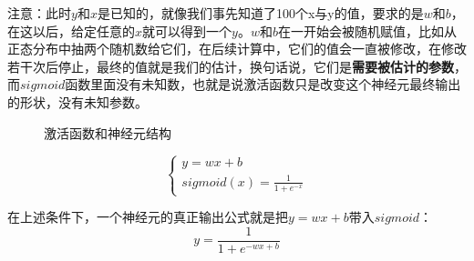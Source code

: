 \documentclass[a5paper, 11pt, openany]{book}
\begin{document}
注意：此时$y$和$x$是已知的，就像我们事先知道了100个x与y的值，要求的是$w$和$b$，在这以后，给定任意的$x$就可以得到一个$y$。$w$和$b$在一开始会被随机赋值，比如从正态分布中抽两个随机数给它们，在后续计算中，它们的值会一直被修改，在修改若干次后停止，最终的值就是我们的估计，换句话说，它们是\textbf{需要被估计的参数}，而$sigmoid$函数里面没有未知数，也就是说激活函数只是改变这个神经元最终输出的形状，没有未知参数。

\begin{figure}[ht]
    \centering
    \caption{激活函数和神经元结构}
    \label{figure1}
\end{figure}

\begin{equation}
    \begin{cases}\label{公式1}
        y=wx+b \\
        sigmoid(x) = \frac{1}{1+e^{-x}}
    \end{cases}
\end{equation}

在上述条件下，一个神经元的真正输出公式就是把$y=wx+b$带入$sigmoid$：
\begin{equation}\label{sig_y}
    y = \frac{1}{1+e^{-wx+b}}
\end{equation}
\end{document}
